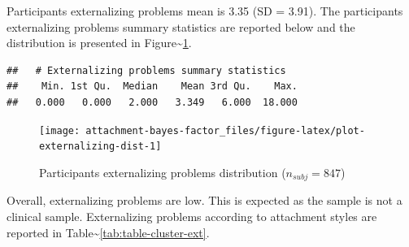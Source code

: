 \documentclass[
]{book}
\begin{document}
Participants externalizing problems mean is 3.35 (SD = 3.91). The participants externalizing problems summary statistics are reported below and the distribution is presented in Figure\textasciitilde\ref{fig:plot-externalizing-dist}.

\begin{verbatim}
##   # Externalizing problems summary statistics
##    Min. 1st Qu.  Median    Mean 3rd Qu.    Max. 
##   0.000   0.000   2.000   3.349   6.000  18.000
\end{verbatim}

\begin{figure}

{\centering \texttt{[image: attachment-bayes-factor\_files/figure-latex/plot-externalizing-dist-1]} 

}

\caption{Participants externalizing problems distribution ($n_{subj} = 847$)}\label{fig:plot-externalizing-dist}
\end{figure}

Overall, externalizing problems are low. This is expected as the sample is not a clinical sample. Externalizing problems according to attachment styles are reported in Table\textasciitilde\ref{tab:table-cluster-ext}.

\begin{table}[!h]

\caption{\label{tab:table-cluster-ext}Externalizing problems according to attachment styles ($n_{subj} = 847$).}
\centering
{}
\end{table}
\end{document}
